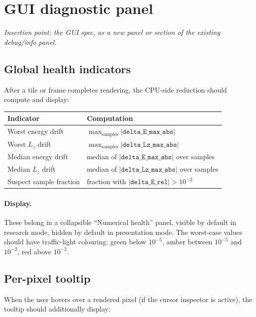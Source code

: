 \documentclass[11pt]{article}
\newcommand{\field}[1]{\texttt{#1}}
\begin{document}
\section{GUI diagnostic panel}
\label{sec:gui}

\textit{Insertion point: the GUI spec, as a new panel or section of the
existing debug/info panel.}

\subsection{Global health indicators}

After a tile or frame completes rendering, the CPU-side reduction should compute
and display:

\begin{center}
\begin{tabular}{ll}
\toprule
Indicator & Computation \\
\midrule
Worst energy drift & $\max_{\text{samples}} |\field{delta\_E\_max\_abs}|$ \\
Worst $L_z$ drift & $\max_{\text{samples}} |\field{delta\_Lz\_max\_abs}|$ \\
Median energy drift & median of $|\field{delta\_E\_max\_abs}|$ over samples \\
Median $L_z$ drift & median of $|\field{delta\_Lz\_max\_abs}|$ over samples \\
Suspect sample fraction & fraction with $|\field{delta\_E\_rel}| > 10^{-2}$ \\
\bottomrule
\end{tabular}
\end{center}

\paragraph{Display.} These belong in a collapsible ``Numerical health'' panel,
visible by default in research mode, hidden by default in presentation mode.
The worst-case values should have traffic-light colouring: green below
$10^{-5}$, amber between $10^{-5}$ and $10^{-2}$, red above $10^{-2}$.

\subsection{Per-pixel tooltip}

When the user hovers over a rendered pixel (if the cursor inspector is active),
the tooltip should additionally display:
\end{document}
